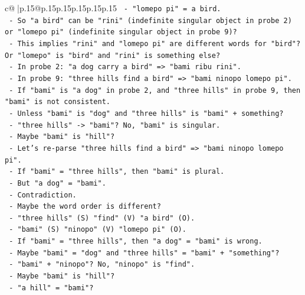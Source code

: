\documentclass{article}
\begin{document}
{\begin{supertabular}{c@{$\;$}|p{.15\linewidth}@{}p{.15\linewidth}p{.15\linewidth}p{.15\linewidth}p{.15\linewidth}p{.15\linewidth}}
{{{\texttt{               {-} "lomepo pi" = a bird.} \\
\texttt{               {-} So "a bird" can be "rini" (indefinite singular object in probe 2) or "lomepo pi" (indefinite singular object in probe 9)?} \\
\texttt{               {-} This implies "rini" and "lomepo pi" are different words for "bird"? Or "lomepo" is "bird" and "rini" is something else?} \\
\texttt{               {-} In probe 2: "a dog carry a bird" => "bami ribu rini".} \\
\texttt{               {-} In probe 9: "three hills find a bird" => "bami ninopo lomepo pi".} \\
\texttt{               {-} If "bami" is "a dog" in probe 2, and "three hills" in probe 9, then "bami" is not consistent.} \\
\texttt{               {-} Unless "bami" is "dog" and "three hills" is "bami" + something?} \\
\texttt{               {-} "three hills" {-}> "bami"? No, "bami" is singular.} \\
\texttt{               {-} Maybe "bami" is "hill"?} \\
\texttt{               {-} Let's re{-}parse "three hills find a bird" => "bami ninopo lomepo pi".} \\
\texttt{                 {-} If "bami" = "three hills", then "bami" is plural.} \\
\texttt{                 {-} But "a dog" = "bami".} \\
\texttt{                 {-} Contradiction.} \\
\texttt{               {-} Maybe the word order is different?} \\
\texttt{                 {-} "three hills" (S) "find" (V) "a bird" (O).} \\
\texttt{                 {-} "bami" (S) "ninopo" (V) "lomepo pi" (O).} \\
\texttt{                 {-} If "bami" = "three hills", then "a dog" = "bami" is wrong.} \\
\texttt{                 {-} Maybe "bami" = "dog" and "three hills" = "bami" + "something"?} \\
\texttt{                 {-} "bami" + "ninopo"? No, "ninopo" is "find".} \\
\texttt{                 {-} Maybe "bami" is "hill"?} \\
\texttt{                   {-} "a hill" = "bami"?} \\
}}}
\end{supertabular}}
\end{document}

